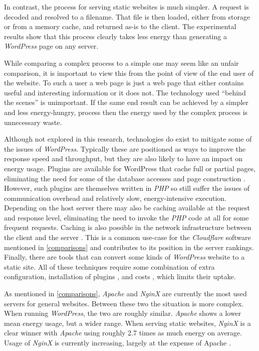 In contrast, the process for serving static websites is much simpler. A request is decoded and resolved to a filename. That file is then loaded, either from storage or from a memory cache, and returned as-is to the client. The experimental results show that this process clearly takes less energy than generating a \emph{WordPress} page on any server.

\label{A171}
While comparing a complex process to a simple one may seem like an unfair comparison, it is important to view this from the point of view of the end user of the website. To such a user a web page is just a web page that either contains useful and interesting information or it does not. The technology used \enquote{behind the scenes} is unimportant. If the same end result can be achieved by a simpler and less energy-hungry, process then the energy used by the complex process is unnecessary waste.

Although not explored in this research, technologies do exist to mitigate some of the issues of \emph{WordPress}. Typically these are positioned as ways to improve the response speed and throughput, but they are also likely to have an impact on energy usage. Plugins are available for WordPress that cache full or partial pages, eliminating the need for some of the database accesses and page construction \citep{BoldGrid2022}. However, such plugins are themselves written in \emph{PHP} so still suffer the issues of communication overhead and relatively slow, energy-intensive execution. Depending on the host server there may also be caching available at the request and response level, eliminating the need to invoke the \emph{PHP} code at all for some frequent requests. Caching is also possible in the network infrastructure between the client and the server \citep{Kusuma2017}. This is a common use-case for the \emph{Cloudflare} software mentioned in \autoref{comparisons} and contributes to its position in the server rankings. Finally, there are tools that can convert some kinds of \emph{WordPress} website to a static site. All of these techniques require some combination of extra configuration, installation of plugins \citep{Data2017}, and costs \citep{Strattic}, which limits their uptake. 

As mentioned in \autoref{comparisons}, \emph{Apache} and \emph{NginX} are currently the most used servers for general websites. Between these two the situation is more complex. When running \emph{WordPress}, the two are roughly similar. \emph{Apache} shows a lower mean energy usage, but a wider range. When serving static websites, \emph{NginX} is a clear winner with \emph{Apache} using roughly 2.7 times as much energy on average. Usage of \emph{NginX} is currently increasing, largely at the expense of Apache \citep{Netcraft2023}.

